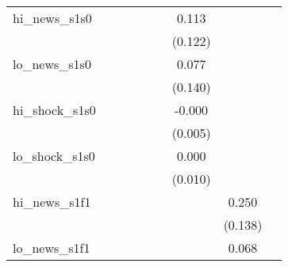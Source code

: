 {\begin{tabular}{l*{8}{c}}
\addlinespace
hi\_news\_s1s0&                     &                     &                     &                     &                     &       0.113         &                     &                     \\
            &                     &                     &                     &                     &                     &     (0.122)         &                     &                     \\
\addlinespace
lo\_news\_s1s0&                     &                     &                     &                     &                     &       0.077         &                     &                     \\
            &                     &                     &                     &                     &                     &     (0.140)         &                     &                     \\
\addlinespace
hi\_shock\_s1s0&                     &                     &                     &                     &                     &      -0.000         &                     &                     \\
            &                     &                     &                     &                     &                     &     (0.005)         &                     &                     \\
\addlinespace
lo\_shock\_s1s0&                     &                     &                     &                     &                     &       0.000         &                     &                     \\
            &                     &                     &                     &                     &                     &     (0.010)         &                     &                     \\
\addlinespace
hi\_news\_s1f1&                     &                     &                     &                     &                     &                     &       0.250\sym{*}  &                     \\
            &                     &                     &                     &                     &                     &                     &     (0.138)         &                     \\
\addlinespace
lo\_news\_s1f1&                     &                     &                     &                     &                     &                     &       0.068         &                     \\

\end{tabular}}
